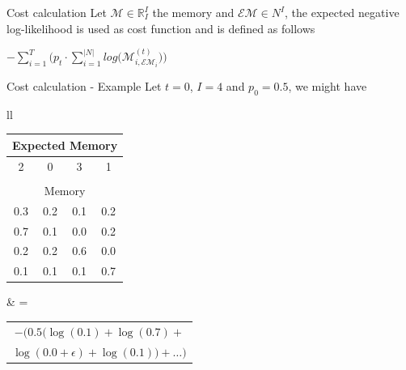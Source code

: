 \documentclass[xcolor={usenames}]{beamer}
\begin{document}
  \begin{frame}{Cost calculation}
  	Let $\mathcal{M} \in \mathbb{R}^I_I$ the memory and $\mathcal{EM} \in N^I$, the expected negative log-likelihood is used as cost function and is defined as follows
  	\begin{center}
  		$-\sum\limits_{i=1}^{T}\Bigg(p_{t}\cdot\sum\limits_{i=1}^{|N|}log\Big(\mathcal{M}_{i, \mathcal{EM}_{i}}^{(t)}\Big)\Bigg)$
  	\end{center}
  \end{frame}
  \begin{frame}{Cost calculation - Example}
  	Let $t = 0$, $I = 4$ and $p_0 = 0.5$, we might have
  	\begin{table}
  		\centering
  		\begin{tabular}{ll}
  				\begin{tabular}{|c|c|c|c|}
					\multicolumn{4}{c}{Expected Memory} \\ \hline
					2 & 0 & 3 & 1 \\ \hline
					\multicolumn{4}{c}{} \\ 
					\multicolumn{4}{c}{Memory} \\ \hline
					0.3 & 0.2 & \cellcolor{mTableAlert}0.1 & 0.2 \\ \hline
					\cellcolor{mTableAlert}0.7 & 0.1 & 0.0 & 0.2 \\ \hline
					0.2 & 0.2 & 0.6 & \cellcolor{mTableAlert}0.0 \\ \hline
					0.1 & \cellcolor{mTableAlert}0.1 & 0.1 & 0.7 \\	 \hline		
  				\end{tabular} &
  			= \begin{tabular}{@{}c}$-(0.5 (\log(0.1) + \log(0.7) + $\\$\log(0.0 + \epsilon) + \log(0.1)) + \dots)$\end{tabular}
  		\end{tabular}
  	\end{table}
  \end{frame}
\end{document}
